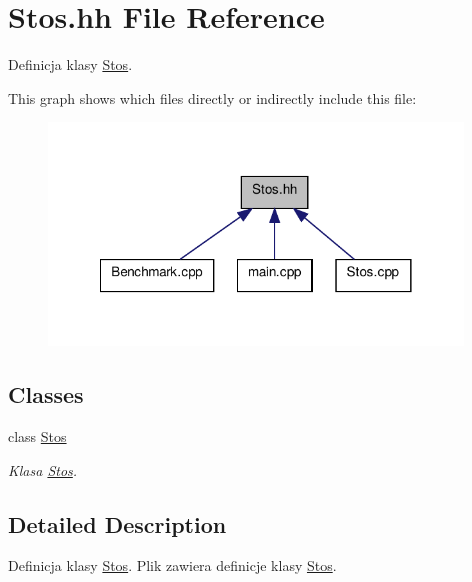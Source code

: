 \hypertarget{a00013}{\section{Stos.\-hh File Reference}
\label{a00013}
}


Definicja klasy \hyperlink{a00004}{Stos}.  


This graph shows which files directly or indirectly include this file\-:\nopagebreak
\begin{figure}[H]
\begin{center}
\leavevmode
\includegraphics[width=312pt]{a00024}
\end{center}
\end{figure}
\subsection*{Classes}
\begin{DoxyCompactItemize}
\item 
class \hyperlink{a00004}{Stos}
\begin{DoxyCompactList}\small\item\em Klasa \hyperlink{a00004}{Stos}. \end{DoxyCompactList}\end{DoxyCompactItemize}


\subsection{Detailed Description}
Definicja klasy \hyperlink{a00004}{Stos}. Plik zawiera definicje klasy \hyperlink{a00004}{Stos}. 